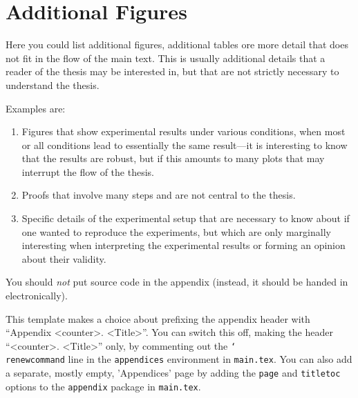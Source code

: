 
\chapter{Additional Figures}
Here you could list additional figures, additional tables ore more detail that does not fit in the flow of the main text.
This is usually additional details that a reader of the thesis may be interested in, but that are not strictly necessary to understand the thesis.

Examples are:
\begin{enumerate}
    \item Figures that show experimental results under various conditions, when most or all conditions lead to essentially the same result---it is interesting to know that the results are robust, but if this amounts to many plots that may interrupt the flow of the thesis.
    \item Proofs that involve many steps and are not central to the thesis.
    \item Specific details of the experimental setup that are necessary to know about if one wanted to reproduce the experiments, but which are only marginally interesting when interpreting the experimental results or forming an opinion about their validity.
\end{enumerate}

You should \emph{not} put source code in the appendix (instead, it should be handed in electronically).

This template makes a choice about prefixing the appendix header with ``Appendix <counter>. <Title>''.
You can switch this off, making the header ``<counter>. <Title>'' only, by commenting out the \texttt{\char`\\renewcommand} line in the \texttt{appendices} environment in \texttt{main.tex}.
You can also add a separate, mostly empty, 'Appendices' page by adding the \texttt{page} and \texttt{titletoc} options to the \texttt{appendix} package in \texttt{main.tex}.
